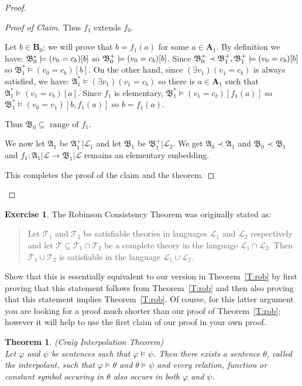 \documentclass[titlepage, oneside]{amsbook}
\theoremstyle{plain}
\newtheorem{theorem}{Theorem}
\theoremstyle{definition}
\newtheorem{exercise}{Exercise}
\theoremstyle{remark}
\newcommand{\tee}{\ensuremath{\mathcal{T}}}
\newcommand{\lan}{\ensuremath{\mathcal{L}}}
\newcommand{\seq}{\ensuremath{\subseteq}}
\newcommand{\ma}{\ensuremath{\mathfrak{A}}}
\newcommand{\mb}{\ensuremath{\mathfrak{B}}}
\newcommand{\ba}{\ensuremath{\mathbf{A}}}
\newcommand{\bb}{\ensuremath{\mathbf{B}}}
\begin{document}
\begin{proof}
\begin{proof}[Proof of Claim]
Thus  $f_1 $ extends $f_0$.


Let $b \in \bb_0$; we will prove that $b = f_1 (a)$ for some $a \in
\ba_1$.  By definition we have: $ \bostar \models  (v_0 = c_b )[b]$
so $ \bop  \models (v_0 = c_b ) [b] $.
Since $ \bop \prec \mb_1^+, \mb_1^+ \models (v_0 = c_b ) [b]  $
so  $\mb_1^{\ast} \models (v_0 = c_b ) [b]$.
On the other hand, since $(\exists v_1)(v_1 = c_b)$ is always
satisfied,
we have:
$ \ma_1^{\ast} \models (\exists v_1) (v_1 = c_b) $
so there is $a \in \ba_1$ such that $ \ma_1^{\ast} \models (v_1
= c_b)[a]. $
Since $ f_1 $ is elementary, $ \mb_1^{\ast} \models ( v_1
= c_b) [f_1 (a) ] $
so $ \mb_1^{\ast} \models (v_0 = v_1 )[ b, f_1 (a) ] $
so $ b=f_1(a)$.

Thus  $  \mb_0 \seq \mbox{ range of } f_1$.

We now let $\ma_1$ be $\ma_1^+ | \lan_1 $ and
let $\mb_1$ be $\mb_1^+ |\lan_2$.  We get
$\ma_0 \prec \ma_1$ and $\mb_0 \prec \mb_1$ and $f_1 : \ma_1 | \lan
\to \mb_1 | \lan$ remains an elementary embedding.

This completes the proof of the claim and the theorem.
\renewcommand{\qedsymbol}{}
\end{proof}

\end{proof}


\begin{exercise}\label{E:rcthm}  
The Robinson Consistency Theorem was originally stated as: 
\begin{quotation} Let $\tee_1$ and $\tee_2$ be satisfiable theories in
languages $\lan_1$ and $\lan_2$ respectively and let $\tee \seq \tee_1
\cap \tee_2$ be a complete theory in the language $\lan_1 \cap \lan_2$.
Then $\tee_1 \cup \tee_2$ is satisfiable in the language $\lan_1 \cup
\lan_2$.
\end{quotation}

Show that this is essentially equivalent to our version in
Theorem~\ref{T:rob} by first proving that this statement follows from
Theorem~\ref{T:rob} and then also proving that this statement implies
Theorem~\ref{T:rob}.  Of course, for this latter argument you are
looking for a proof much shorter than our proof of Theorem~\ref{T:rob};
however it will help to use the first claim of our proof in your own
proof.

\end{exercise}


\begin{theorem} (Craig Interpolation Theorem)\label{T:cit}\\
%
Let $\varphi $ and $\psi $ be sentences such that $\varphi \models \psi 
$.
Then there exists a sentence $\theta $, called the interpolant, such
that $\varphi \models \theta  $ and $\theta \models \psi$ and every
relation, function or constant symbol occuring in $\theta$ also occurs
in both $\varphi$ and $\psi$. 

\end{theorem}
\end{document}
